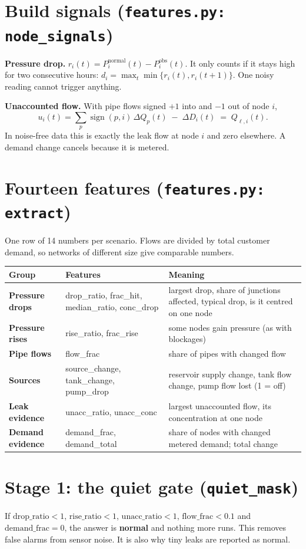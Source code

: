 \documentclass[11pt,a4paper]{article}
\newcommand{\code}[1]{\texttt{#1}}
\begin{document}
\section{Build signals (\code{features.py: node\_signals})}
\textbf{Pressure drop.} $r_i(t)=P^{\text{normal}}_i(t)-P^{\text{obs}}_i(t)$. It only counts if it stays high for two consecutive hours: $d_i=\max_t\min\{r_i(t),r_i(t{+}1)\}$. One noisy reading cannot trigger anything.

\textbf{Unaccounted flow.} With pipe flows signed $+1$ into and $-1$ out of node $i$,
\[u_i(t)=\sum_p\operatorname{sign}(p,i)\,\Delta Q_p(t)\;-\;\Delta D_i(t)\;=\;Q_{\ell,i}(t).\]
In noise-free data this is exactly the leak flow at node $i$ and zero elsewhere. A demand change cancels because it is metered.

\section{Fourteen features (\code{features.py: extract})}
One row of 14 numbers per scenario. Flows are divided by total customer demand, so networks of different size give comparable numbers.
\begin{center}\small\begin{tabularx}{\linewidth}{@{}>{\bfseries}p{3.0cm}>{\ttfamily}p{3.6cm}Y@{}}\toprule
Group & Features & Meaning \\\midrule
Pressure drops & drop\_ratio, frac\_hit, median\_ratio, conc\_drop & largest drop, share of junctions affected, typical drop, is it centred on one node \\
Pressure rises & rise\_ratio, frac\_rise & some nodes gain pressure (as with blockages) \\
Pipe flows & flow\_frac & share of pipes with changed flow \\
Sources & source\_change, tank\_change, pump\_drop & reservoir supply change, tank flow change, pump flow lost (1 = off) \\
Leak evidence & unacc\_ratio, unacc\_conc & largest unaccounted flow, its concentration at one node \\
Demand evidence & demand\_frac, demand\_total & share of nodes with changed metered demand; total change \\\bottomrule\end{tabularx}\end{center}

\section{Stage 1: the quiet gate (\code{quiet\_mask})}
If $\text{drop\_ratio}<1$, $\text{rise\_ratio}<1$, $\text{unacc\_ratio}<1$, $\text{flow\_frac}<0.1$ and $\text{demand\_frac}=0$, the answer is \textbf{normal} and nothing more runs. This removes false alarms from sensor noise. It is also why tiny leaks are reported as normal.
\end{document}
